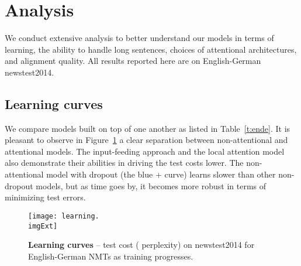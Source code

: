 \documentclass[11pt,a4paper]{article}
\newcommand{\imgExt}{eps}
\newcommand{\edit}[1]{{#1}} \newcommand{\hide}[1]{}
\begin{document}
\section{Analysis}
\label{sec:analysis}
\edit{We conduct extensive analysis to better understand our models in terms
of learning, the ability to handle long sentences, 
choices of attentional architectures, and alignment quality.} All results
reported here are on English-German newstest2014.
\begin{table}
\centering
{}
\caption{{\bf WMT'15 German-English results} -- 
performances of various systems (similar to 
Table~\ref{t:ende}). The {\it base} system already includes source reversing
on which we add {\it global} attention, {\it drop}out, input {\it feed}ing, and
{\it unk} replacement.}
\label{t:deen}
\end{table}


\subsection{Learning curves}
We compare models built on top of one another as listed in Table~\ref{t:ende}. It is
pleasant to observe in Figure~\ref{f:learn} a clear separation between non-attentional and attentional
models. The input-feeding approach and the local attention
model also demonstrate their abilities in driving the test costs lower. The
non-attentional model with 
dropout (the blue + curve) learns slower than other non-dropout models, but
as time goes by, it becomes more robust in terms of minimizing test errors.
\begin{figure}
\centering
\texttt{[image: learning.\\imgExt]} \caption{{\bf Learning curves} -- test cost ( perplexity) on newstest2014 for English-German NMTs as training progresses.
} 
\label{f:learn}
\end{figure}
\end{document}
